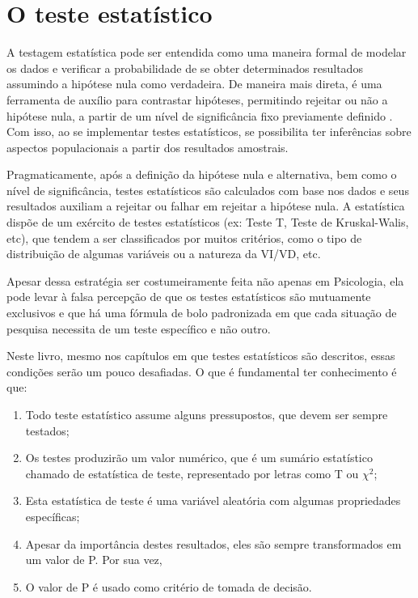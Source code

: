 \documentclass[
]{book}
\providecommand{\tightlist}{%
  \setlength{\itemsep}{0pt}\setlength{\parskip}{0pt}}
\begin{document}
\hypertarget{o-teste-estatuxedstico}{%
\section{O teste estatístico}\label{o-teste-estatuxedstico}}

A testagem estatística pode ser entendida como uma maneira formal de modelar os dados e verificar a probabilidade de se obter determinados resultados assumindo a hipótese nula como verdadeira. De maneira mais direta, é uma ferramenta de auxílio para contrastar hipóteses, permitindo rejeitar ou não a hipótese nula, a partir de um nível de significância fixo previamente definido \citep{Lecoutre2014}. Com isso, ao se implementar testes estatísticos, se possibilita ter inferências sobre aspectos populacionais a partir dos resultados amostrais.

Pragmaticamente, após a definição da hipótese nula e alternativa, bem como o nível de significância, testes estatísticos são calculados com base nos dados e seus resultados auxiliam a rejeitar ou falhar em rejeitar a hipótese nula. A estatística dispõe de um exército de testes estatísticos (ex: Teste T, Teste de Kruskal-Walis, etc), que tendem a ser classificados por muitos critérios, como o tipo de distribuição de algumas variáveis ou a natureza da VI/VD, etc.

Apesar dessa estratégia ser costumeiramente feita não apenas em Psicologia, ela pode levar à falsa percepção de que os testes estatísticos são mutuamente exclusivos e que há uma fórmula de bolo padronizada em que cada situação de pesquisa necessita de um teste específico e não outro.

Neste livro, mesmo nos capítulos em que testes estatísticos são descritos, essas condições serão um pouco desafiadas. O que é fundamental ter conhecimento é que:

\begin{enumerate}
\def\labelenumi{(\arabic{enumi})}
\tightlist
\item
  Todo teste estatístico assume alguns pressupostos, que devem ser sempre testados;\\
\item
  Os testes produzirão um valor numérico, que é um sumário estatístico chamado de estatística de teste, representado por letras como T ou \(\chi^2\);\\
\item
  Esta estatística de teste é uma variável aleatória com algumas propriedades específicas;\\
\item
  Apesar da importância destes resultados, eles são sempre transformados em um valor de P. Por sua vez,\\
\item
  O valor de P é usado como critério de tomada de decisão.
\end{enumerate}
\end{document}
